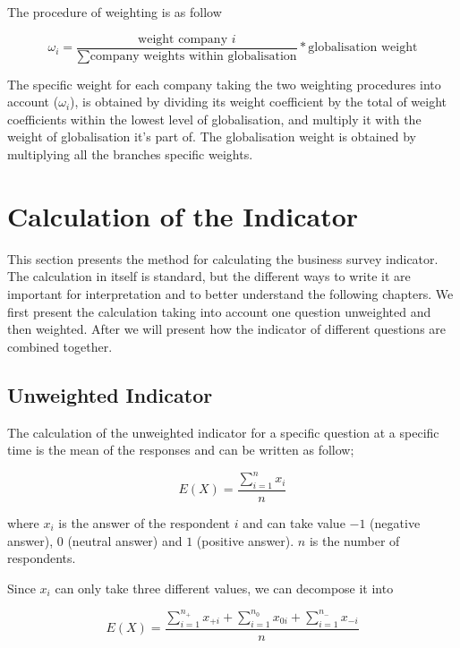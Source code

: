 \documentclass[12pt,a4paper,oneside]{book}
\begin{document}
The procedure of weighting is as follow

\begin{equation}
	\omega_i = \frac{ \text{weight company $i$} }{ \sum\text{company weights within globalisation} } * \text{globalisation weight} 
\end{equation}

The specific weight for each company taking the two weighting procedures into account ($\omega_i$), is obtained by dividing its weight coefficient by the total of weight coefficients within the lowest level of globalisation, and multiply it with the weight of globalisation it's part of. 
The globalisation weight is obtained by multiplying all the branches specific weights.


\section{Calculation of the Indicator}

This section presents the method for calculating the business survey indicator. 
The calculation in itself is standard, but the different ways to write it are important for interpretation and to better understand the following chapters. 
We first present the calculation taking into account one question  unweighted and then weighted. 
After we will present how the indicator of different questions are combined together.


\subsection{Unweighted Indicator}

The calculation of the unweighted indicator for a specific question at a specific time is the mean of the responses and can be written as follow;

\begin{equation}
    E(X) = \frac{ \sum_{i=1}^n x_i}{n}
\end{equation} 

where 
$x_i$ is the answer of the respondent $i$ and can take value $-1$ (negative answer), $0$ (neutral answer) and $1$ (positive answer). 
$n$ is the number of respondents.

Since $x_i$ can only take three different values, we can decompose it into 

\begin{equation}
    E(X) = \frac{ \sum_{i=1}^{n_+} x_{+i} + \sum_{i=1}^{n_0} x_{0i} + \sum_{i=1}^{n_-} x_{-i}}{n}
\end{equation} 
\end{document}
